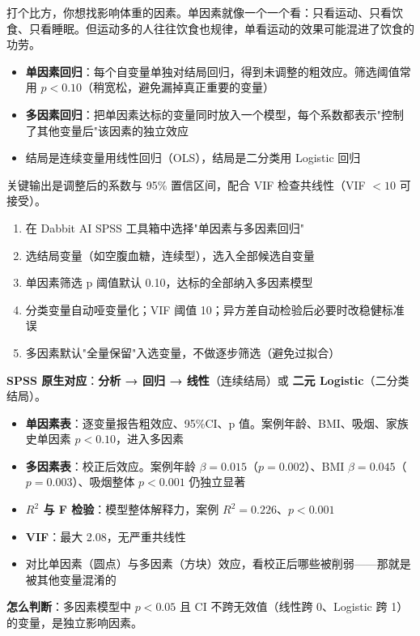 \begin{algoprinciple}
打个比方，你想找影响体重的因素。单因素就像一个一个看：只看运动、只看饮食、只看睡眠。但运动多的人往往饮食也规律，单看运动的效果可能混进了饮食的功劳。

\begin{itemize}
    \item \textbf{单因素回归}：每个自变量单独对结局回归，得到未调整的粗效应。筛选阈值常用 $p<0.10$（稍宽松，避免漏掉真正重要的变量）
    \item \textbf{多因素回归}：把单因素达标的变量同时放入一个模型，每个系数都表示"控制了其他变量后"该因素的独立效应
    \item 结局是连续变量用线性回归（OLS），结局是二分类用 Logistic 回归
\end{itemize}

关键输出是调整后的系数与 95\% 置信区间，配合 VIF 检查共线性（VIF $<10$ 可接受）。
\end{algoprinciple}

\begin{algosposs}
\begin{enumerate}
    \item 在 Dabbit AI SPSS 工具箱中选择"单因素与多因素回归"
    \item 选结局变量（如空腹血糖，连续型），选入全部候选自变量
    \item 单因素筛选 p 阈值默认 0.10，达标的全部纳入多因素模型
    \item 分类变量自动哑变量化；VIF 阈值 10；异方差自动检验后必要时改稳健标准误
    \item 多因素默认"全量保留"入选变量，不做逐步筛选（避免过拟合）
\end{enumerate}

\textbf{SPSS 原生对应}：\textbf{分析 → 回归 → 线性}（连续结局）或 \textbf{二元 Logistic}（二分类结局）。
\end{algosposs}

\begin{algoresult}
\begin{itemize}
    \item \textbf{单因素表}：逐变量报告粗效应、95\%CI、p 值。案例年龄、BMI、吸烟、家族史单因素 $p<0.10$，进入多因素
    \item \textbf{多因素表}：校正后效应。案例年龄 $\beta=0.015$（$p=0.002$）、BMI $\beta=0.045$（$p=0.003$）、吸烟整体 $p<0.001$ 仍独立显著
    \item \textbf{$R^2$ 与 F 检验}：模型整体解释力，案例 $R^2=0.226$、$p<0.001$
    \item \textbf{VIF}：最大 2.08，无严重共线性
    \item 对比单因素（圆点）与多因素（方块）效应，看校正后哪些被削弱——那就是被其他变量混淆的
\end{itemize}

\textbf{怎么判断}：多因素模型中 $p<0.05$ 且 CI 不跨无效值（线性跨 0、Logistic 跨 1）的变量，是独立影响因素。
\end{algoresult}


